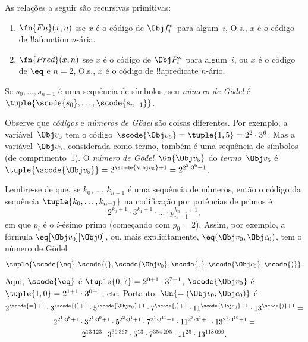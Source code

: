 \documentclass[../../../include/open-logic-section]{subfiles}
\begin{document}
\begin{prop}
As relações a seguir são recursivas primitivas:
\begin{enumerate}
\item $\fn{Fn}(x, n)$ sse $x$ é o código de $\Obj f^n_i$ para algum~$i$,
  O.s.\@, $x$ é o código de !!a{function} $n$-ária.
\item $\fn{Pred}(x, n)$ sse $x$ é o código de $\Obj P^n_i$ para
  algum~$i$, ou $x$ é o código de $\eq$ e $n = 2$, O.s.\@, $x$ é o
  código de !!a{predicate} $n$-ário.
\end{enumerate}
\end{prop}

\begin{defn}
Se $s_0, \dots, s_{n-1}$ é uma sequência de símbolos, seu \emph{número
  de G\"odel} é $\tuple{\scode{s_0}, \dots, \scode{s_{n-1}}}$.
\end{defn}

\begin{explain}
Observe que \emph{códigos} e \emph{números de G\"odel} são coisas
diferentes. Por exemplo, a variável~$\Obj v_5$ tem o código~$\scode{\Obj
  v_5} = \tuple{1, 5} = 2^2\cdot 3^6$. Mas a variável~$\Obj v_5$,
considerada como termo, também é uma sequência de símbolos (de
comprimento~$1$). O \emph{número de G\"odel}~$\Gn{\Obj v_5}$ do
\emph{termo}~$\Obj v_5$ é $\tuple{\scode{\Obj v_5}} = 2^{\scode{\Obj
    v_5} + 1} = 2^{2^2\cdot 3^6 + 1}$.
\end{explain}

\begin{ex}
Lembre-se de que, se $k_0$, \dots, $k_{n-1}$ é uma sequência de
números, então o código da sequência $\tuple{k_0, \dots, k_{n-1}}$ na
codificação por potências de primos é
\[
2^{k_0+1}\cdot3^{k_1+1}\cdot \dots \cdot p_{n-1}^{k_{n-1}+1},
\]
em que $p_i$ é o $i$-ésimo primo (começando com $p_0 = 2$). Assim, por
exemplo, a fórmula $\eq[\Obj v_0][\Obj 0]$, ou, mais explicitamente,
${\eq}(\Obj v_0,\Obj c_0)$, tem o número de G\"odel
\[
\tuple{\scode{\eq},\scode{(},\scode{\Obj v_0},\scode{,}, \scode{\Obj
    c_0},\scode{)}}.
\]
Aqui, $\scode{\eq}$ é $\tuple{0,7} = 2^{0+1}\cdot
3^{7+1}$, $\scode{\Obj v_0}$ é $\tuple{1,0} = 2^{1+1}\cdot3^{0+1}$,
etc. Portanto, $\Gn{=(\Obj v_0,\Obj c_0)}$ é
\begin{multline*}
2^{\scode{=} + 1}\cdot 3^{\scode{(}+1}\cdot 5^{\scode{\Obj v_0}+1}
\cdot 7^{\scode{,} + 1} \cdot 11^{\scode{\Obj c_0}+1} \cdot
13^{\scode{)}+1} = \\
2^{2^1\cdot 3^8 + 1}\cdot 3^{2^1\cdot 3^9+1}\cdot 5^{2^2\cdot 3^1+1}
\cdot 7^{2^1\cdot 3^{11} + 1} \cdot 11^{2^3\cdot3^1+1} \cdot
13^{2^1\cdot3^{10}+1} = \\
2^{13\,123}\cdot 3^{39\,367}\cdot 5^{13}\cdot 7^{354\,295}\cdot11^{25}\cdot13^{118\,099}.
\end{multline*}
\end{ex}
\end{document}
